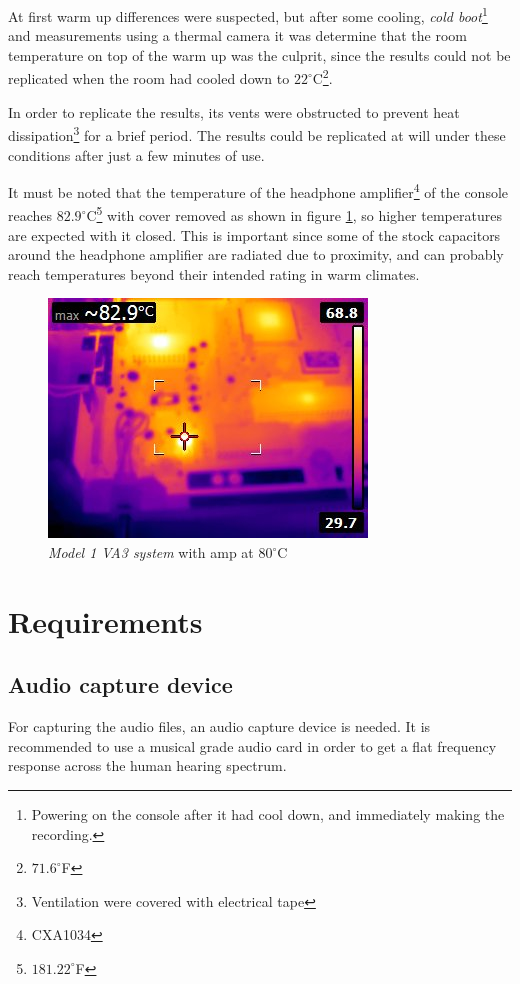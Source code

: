 \documentclass[10pt,a4paper]{report}
\begin{document}
\begin{appendices}
At first warm up differences were suspected, but after some cooling, \textit{cold boot}\footnote{Powering on the console after it had cool down, and immediately making the recording.} and measurements using a thermal camera it was determine that the room temperature on top of the warm up was the culprit, since the results could not be replicated when the room had cooled down to $22^\circ$C\footnote{$71.6^\circ$F}. 

In order to replicate the results, its vents were obstructed to prevent heat dissipation\footnote{Ventilation were covered with electrical tape} for a brief period. The results could be replicated at will under these conditions after just a few minutes of use.

It must be noted that the temperature of the headphone amplifier\footnote{CXA1034} of the console reaches $82.9^\circ$C\footnote{$181.22^\circ$F} with cover removed as shown in figure \ref{fig:heathigh}, so higher temperatures are expected with it closed. This is important since some of the stock capacitors around the headphone amplifier are radiated due to proximity, and can probably reach temperatures beyond their intended rating in warm climates.

\begin{figure}[H]
	\centering
	\includegraphics[width=0.4\linewidth]{images/heat/2-hot.jpg}
	\caption[Hot Console]{\textit{Model 1 VA3 system} with amp at $80^\circ$C}
	\label{fig:heathigh}
\end{figure}

\chapter{Requirements}
\label{requirements}
\section{Audio capture device}
\label{audiocards}
For capturing the audio files, an audio capture device is needed. It is recommended to use a musical grade audio card in order to get a flat frequency response across the human hearing spectrum.


\end{appendices}
\end{document}
